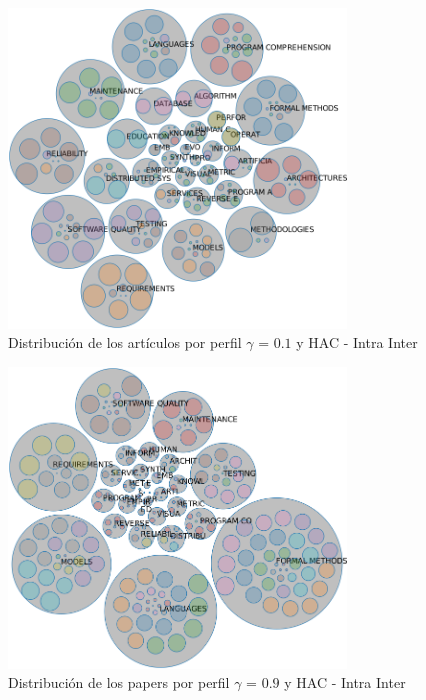 \begin{figure}[H]
  \centering
    \includegraphics[width=0.8\textwidth]{resultados/papers/HAC/INTRA_INTER/bubbles-gamma-01.png}
  \caption{Distribución de los artículos por perfil $\gamma$ = $0.1$ y HAC - Intra Inter}
  \label{res:img-papers-bubbles-gamma01-hac-intra-inter}
\end{figure}

\begin{figure}[H]
  \centering
    \includegraphics[width=0.8\textwidth]{resultados/papers/HAC/INTRA_INTER/bubbles-gamma-09.png}
  \caption{Distribución de los papers por perfil $\gamma$ = $0.9$ y HAC - Intra Inter}
  \label{res:img-papers-bubbles-gamma09-hac-intra-inter}
\end{figure}

